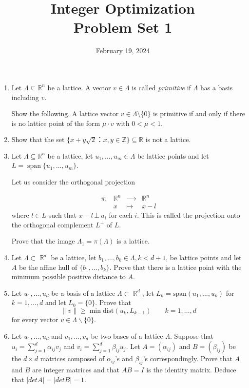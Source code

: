 \documentclass[11pt,a4paper]{article}
\title{Integer Optimization  \\ Problem Set 1 }
\date{February 19, 2024}
\DeclareMathOperator{\Spa}{span}
\DeclareMathOperator{\RR}{\mathbb{R}}
\begin{document}
\maketitle 




\begin{enumerate} 
\item

  Let $Λ ⊆ ℝ^n$ be a lattice. A vector $v ∈ Λ$ is called \emph{primitive} if $Λ$ has a basis including $v$.

  \medskip

  Show the following. A lattice vector $v ∈ Λ \setminus \{0\}$ is primitive  if and only if there is no lattice point of the form $μ ⋅ v$ with $0<μ<1$.

\item Show that the set $ \{ x + y \sqrt{2} ： x,y ∈ ℤ \} ⊆ ℝ$ is not a lattice.

\item Let $Λ ⊆ ℝ^n$  be a lattice, let $u_1 ,\dots ,u_m  ∈ Λ$  be lattice points and let
  $ L = \Spa \{u_1, \dots , u_m\}$.


  Let us consider the orthogonal projection

  \begin{displaymath}
    \begin{array}{rccc}      
      π : & ℝ^ n &  ⟶ &  ℝ^ n \\
          & x & ↦       & x-l 
          \end{array}
        \end{displaymath}
where $l ∈ L$ such that  $x-l \, ⊥\,  u_i$ for each $i$.         
This is called the projection onto the orthogonal complement $L^⊥$ of $L$.

Prove that the image $Λ_1 = π(Λ)$  is a lattice.


\item Let $Λ ⊂ \RR^d$ be a lattice, let $b_1, \hdots ,b_k ∈ Λ, k < d+1$, be lattice points and let $A$ be the affine hull of $\{b_1, \hdots , b_k\}$. Prove that there is a lattice point with the minimum possible positive distance to $A$.

\item Let $u_1,\hdots ,u_d$ be a basis of a lattice $Λ ⊂ \RR^d$, let $L_k = \text{span}( u_1, \hdots ,u_k)$ for $k = 1, \hdots ,d$ and 
let $L_0 = \{0\}$. Prove that
$$∥v∥ ≥ \min \text{dist}(u_k, L_{k−1}) \qquad k=1,\hdots ,d$$
for every vector $v ∈ Λ \backslash \{0\}$.

\item Let $u_1, \hdots ,u_d$ and $v_1, \hdots ,v_d$ be two bases of a lattice $Λ$. Suppose that
$u_i = \sum_{j =1}^d α_{ij}v_j$ and $v_i = \sum_{j =1}^d β_{ij}u_j$. 
Let $A = (α_{ij})$ and $B = (β_{ij})$ be the $d × d$ matrices composed of $α_{ij}$’s and $β_{ij}$’s correspondingly. 
Prove that $A$ and $B$ are integer matrices and that $AB = I$ is the identity matrix. Deduce that $| det A| = | det B| = 1$.
  

  

\end{enumerate}



%
%


 
\end{document}
